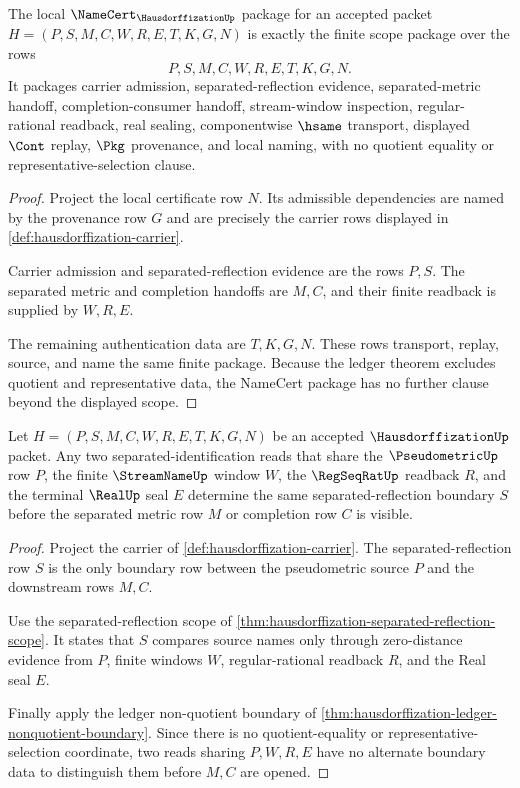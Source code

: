 \begin{theorem}
\label{thm:hausdorffization-namecert-scope-package}
The local $\NameCert_{\HausdorffizationUp}$ package for an accepted packet $H=(P,S,M,C,W,R,E,T,K,G,N)$ is exactly the finite scope package over the rows
$$
P,S,M,C,W,R,E,T,K,G,N .
$$
It packages carrier admission, separated-reflection evidence, separated-metric handoff, completion-consumer handoff, stream-window inspection, regular-rational readback, real sealing, componentwise $\hsame$ transport, displayed $\Cont$ replay, $\Pkg$ provenance, and local naming, with no quotient equality or representative-selection clause.
\end{theorem}
\begin{proof}
Project the local certificate row $N$. Its admissible dependencies are named by the provenance row $G$ and are precisely the carrier rows displayed in \autoref{def:hausdorffization-carrier}.

Carrier admission and separated-reflection evidence are the rows $P,S$. The separated metric and completion handoffs are $M,C$, and their finite readback is supplied by $W,R,E$.

The remaining authentication data are $T,K,G,N$. These rows transport, replay, source, and name the same finite package. Because the ledger theorem excludes quotient and representative data, the NameCert package has no further clause beyond the displayed scope.
\end{proof}

\begin{theorem}
\label{thm:hausdorffization-zero-distance-window-determinacy}
Let $H=(P,S,M,C,W,R,E,T,K,G,N)$ be an accepted $\HausdorffizationUp$ packet. Any two separated-identification reads that share the $\PseudometricUp$ row $P$, the finite $\StreamNameUp$ window $W$, the $\RegSeqRatUp$ readback $R$, and the terminal $\RealUp$ seal $E$ determine the same separated-reflection boundary $S$ before the separated metric row $M$ or completion row $C$ is visible.
\end{theorem}
\begin{proof}
Project the carrier of \autoref{def:hausdorffization-carrier}. The separated-reflection row $S$ is the only boundary row between the pseudometric source $P$ and the downstream rows $M,C$.

Use the separated-reflection scope of \autoref{thm:hausdorffization-separated-reflection-scope}. It states that $S$ compares source names only through zero-distance evidence from $P$, finite windows $W$, regular-rational readback $R$, and the Real seal $E$.

Finally apply the ledger non-quotient boundary of \autoref{thm:hausdorffization-ledger-nonquotient-boundary}. Since there is no quotient-equality or representative-selection coordinate, two reads sharing $P,W,R,E$ have no alternate boundary data to distinguish them before $M,C$ are opened.
\end{proof}

